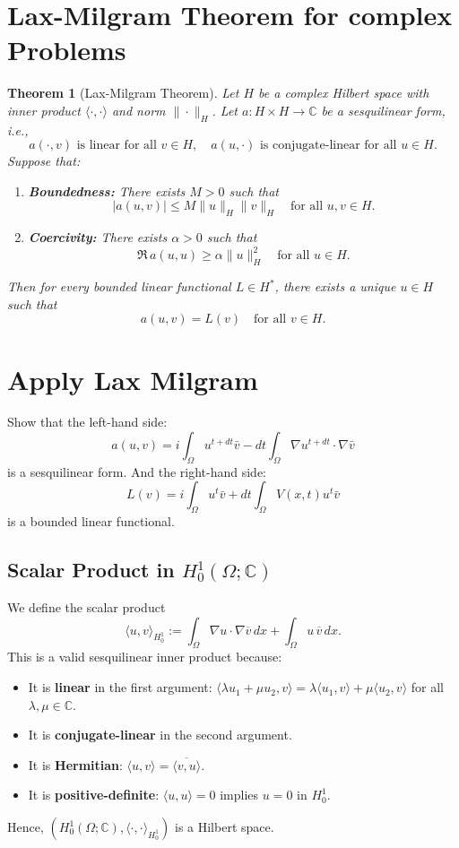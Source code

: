 \documentclass{article}
\theoremstyle{definition}
\theoremstyle{plain}
\newtheorem{theorem}[definition]{Theorem}
\theoremstyle{remark}
\begin{document}
\section{Lax-Milgram Theorem for complex Problems}
\begin{theorem}
[Lax-Milgram Theorem]
Let $H$ be a complex Hilbert space with inner product $\langle \cdot, \cdot \rangle$ and norm $\| \cdot \|_H$. Let $a : H \times H \to \mathbb{C}$ be a sesquilinear form, i.e.,
\[
a(\cdot, v) \text{ is linear for all } v \in H, \quad a(u, \cdot) \text{ is conjugate-linear for all } u \in H.
\]
Suppose that:
\begin{enumerate}
    \item \textbf{Boundedness:} There exists $M > 0$ such that
    \[
    |a(u, v)| \leq M \|u\|_H \|v\|_H \quad \text{for all } u, v \in H.
    \]
    \item \textbf{Coercivity:} There exists $\alpha > 0$ such that
    \[
    \Re \, a(u, u) \geq \alpha \|u\|_H^2 \quad \text{for all } u \in H.
    \]
\end{enumerate}
Then for every bounded linear functional $L \in H^*$, there exists a unique $u \in H$ such that
\[
a(u, v) = L(v) \quad \text{for all } v \in H.
\]
\end{theorem}


\section{Apply Lax Milgram}
Show that the left-hand side: $$a(u,v) = i \int_{\Omega} u^{t + dt} \bar{v} - dt \int_{\Omega} \nabla u^{t + dt} \cdot \nabla \bar{v}$$ is a sesquilinear form.
And the right-hand side: $$L(v) = i \int_{\Omega} u^t \bar{v} + dt \int_{\Omega} V(x,t) u^t \bar{v}$$ is a bounded linear functional.
\subsection{Scalar Product in $H_0^1(\Omega; \mathbb{C})$}
We define the scalar product
\[
\langle u, v \rangle_{H_0^1} := \int_\Omega \nabla u \cdot \nabla \overline{v} \, dx + \int_\Omega u \, \overline{v} \, dx.
\]
This is a valid sesquilinear inner product because:
\begin{itemize}
  \item It is \textbf{linear} in the first argument: $\langle \lambda u_1 + \mu u_2, v \rangle = \lambda \langle u_1, v \rangle + \mu \langle u_2, v \rangle$ for all $\lambda, \mu \in \mathbb{C}$.
  \item It is \textbf{conjugate-linear} in the second argument.
  \item It is \textbf{Hermitian}: $\langle u, v \rangle = \overline{\langle v, u \rangle}$.
  \item It is \textbf{positive-definite}: $\langle u, u \rangle = 0$ implies $u = 0$ in $H_0^1$.
\end{itemize}
Hence, $(H_0^1(\Omega; \mathbb{C}), \langle \cdot, \cdot \rangle_{H_0^1})$ is a Hilbert space.
\end{document}
